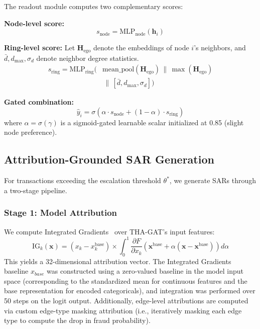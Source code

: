 \documentclass[journal]{IEEEtran}
\begin{document}
The readout module computes two complementary scores:

\textbf{Node-level score:}
\begin{equation}
s_{\text{node}} = \text{MLP}_{\text{node}}(\mathbf{h}_i)
\end{equation}

\textbf{Ring-level score:} Let $\mathbf{H}_{\text{ego}}$ denote the embeddings of node $i$'s neighbors, and $\bar{d}, d_{\max}, \sigma_d$ denote neighbor degree statistics.
\begin{equation}
\begin{split}
s_{\text{ring}} = \text{MLP}_{\text{ring}}\big(&\text{mean\_pool}(\mathbf{H}_{\text{ego}}) \,\|\, \max(\mathbf{H}_{\text{ego}}) \\
&\,\|\, [\bar{d}, d_{\max}, \sigma_d] \big)
\end{split}
\end{equation}

\textbf{Gated combination:}
\begin{equation}
\hat{y}_i = \sigma\!\left(\alpha \cdot s_{\text{node}} + (1 - \alpha) \cdot s_{\text{ring}}\right)
\end{equation}
where $\alpha = \sigma(\gamma)$ is a sigmoid-gated learnable scalar initialized at 0.85 (slight node preference).

\subsection{Attribution-Grounded SAR Generation}
\label{sec:attribution}

For transactions exceeding the escalation threshold $\theta^*$, we generate SARs through a two-stage pipeline.

\subsubsection{Stage 1: Model Attribution}
We compute Integrated Gradients~\cite{sundararajan2017axiomatic} over THA-GAT's input features:
\begin{equation}
\text{IG}_k(\mathbf{x}) = (x_k - x_k^{\text{base}}) \times \int_0^1 \frac{\partial F}{\partial x_k}\!\left(\mathbf{x}^{\text{base}} + \alpha(\mathbf{x} - \mathbf{x}^{\text{base}})\right) d\alpha
\end{equation}
This yields a 32-dimensional attribution vector. The Integrated Gradients baseline $x_{base}$ was constructed using a zero-valued baseline in the model input space (corresponding to the standardized mean for continuous features and the base representation for encoded categoricals), and integration was performed over 50 steps on the logit output. Additionally, edge-level attributions are computed via custom edge-type masking attribution (i.e., iteratively masking each edge type to compute the drop in fraud probability).
\end{document}
